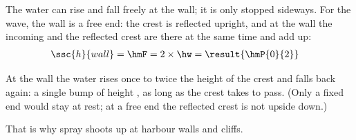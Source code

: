 \begin{abcliste}
\abc The water can rise and fall freely at the wall; it is only stopped sideways. For the wave, the wall is a free end: the crest is reflected upright, and at the wall the incoming and the reflected crest are there at the same time and add up:
\begin{align}
 \ssc{h}{wall} &= \hmF = 2\times\hw = \result{\hmP{0}{2}}
\end{align}

\abc At the wall the water rises once to twice the height of the crest and falls back again: a single bump of height , as long as the crest takes to pass. (Only a fixed end would stay at rest; at a free end the reflected crest is not upside down.)
\begin{center}
\end{center}
That is why spray shoots up at harbour walls and cliffs.
\end{abcliste}
